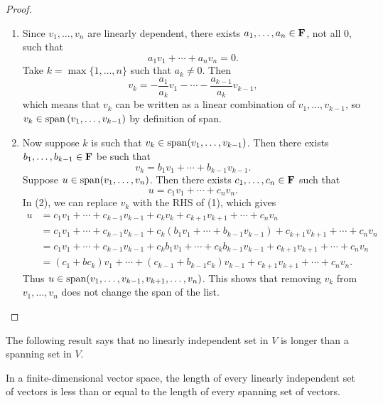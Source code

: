 \begin{proof} \
\begin{enumerate}[label=(\roman*)]
\item Since $v_1,\dots,v_n$ are linearly dependent, there exists $a_1,\dots,a_n\in\mathbf F$, not all $0$, such that
\[a_1v_1+\cdots+a_nv_n=0.\]
Take $k=\max\{1,\dots,n\}$ such that $a_k\neq0$. Then
\[v_k=-\frac{a_1}{a_k}v_1-\cdots-\frac{a_{k-1}}{a_k}v_{k-1},\]
which means that $v_k$ can be written as a linear combination of $v_1,\dots,v_{k-1}$, so $v_k\in\operatorname{span}\left(v_1,\dots,v_{k-1}\right)$ by definition of span.

\item Now suppose $k$ is such that $v_k\in\operatorname{span}(v_1,\dots,v_{k-1})$. Then there exists $b_1,\dots,b_{k-1}\in\mathbf F$ be such that
\begin{equation*}\tag{1}
v_k=b_1v_1+\cdots+b_{k-1}v_{k-1}.
\end{equation*}
Suppose $u\in\operatorname{span}(v_1,\dots,v_n)$. Then there exists $c_1,\dots,c_n\in\mathbf F$ such that
\begin{equation*}\tag{2}
u=c_1v_1+\cdots+c_nv_n.
\end{equation*}
In (2), we can replace $v_k$ with the RHS of (1), which gives
\begin{align*}
u&=c_1v_1+\cdots+c_{k-1}v_{k-1}+c_kv_k+c_{k+1}v_{k+1}+\cdots+c_nv_n\\
&=c_1v_1+\cdots+c_{k-1}v_{k-1}+c_k(b_1v_1+\cdots+b_{k-1}v_{k-1})+c_{k+1}v_{k+1}+\cdots+c_nv_n\\
&=c_1v_1+\cdots+c_{k-1}v_{k-1}+c_kb_1v_1+\cdots+c_kb_{k-1}v_{k-1}+c_{k+1}v_{k+1}+\cdots+c_nv_n\\
&=(c_1+bc_k)v_1+\cdots+(c_{k-1}+b_{k-1}c_k)v_{k-1}+c_{k+1}v_{k+1}+\cdots+c_nv_n.
\end{align*}
Thus $u\in\operatorname{span}(v_1,\dots,v_{k-1},v_{k+1},\dots,v_n)$. This shows that removing $v_k$ from $v_1,\dots,v_n$ does not change the span of the list.
\end{enumerate}
\end{proof}

The following result says that no linearly independent set in $V$ is longer than a spanning set in $V$.

\begin{proposition}\label{prop:length-linind-span}
In a finite-dimensional vector space, the length of every linearly independent set of vectors is less than or equal to the length of every spanning set of vectors.
\end{proposition}

